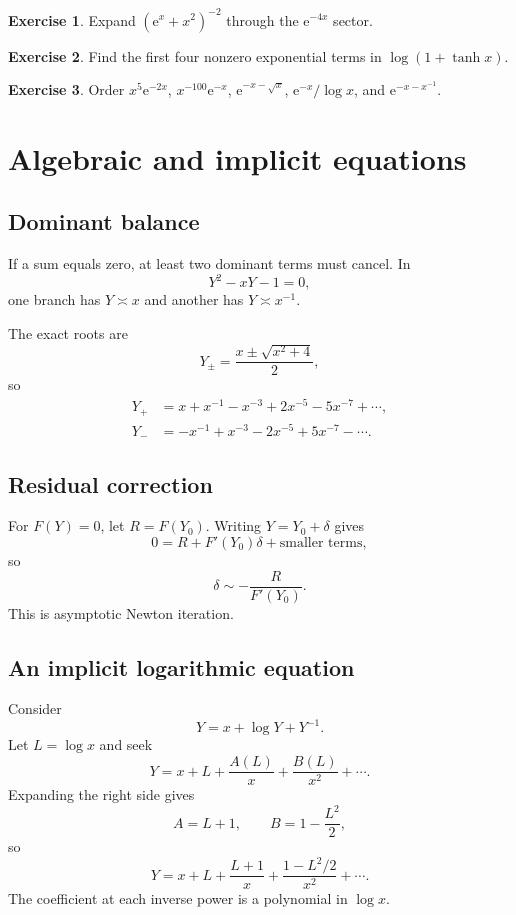\documentclass[11pt,oneside,openany]{book}
\newcommand{\e}{\mathrm{e}}
\theoremstyle{plain}
\theoremstyle{definition}
\newtheorem{exercise}{Exercise}[chapter]
\theoremstyle{remark}
\begin{document}
\begin{exercise}
Expand $(\e^x+x^2)^{-2}$ through the $\e^{-4x}$ sector.
\end{exercise}

\begin{exercise}
Find the first four nonzero exponential terms in $\log(1+\tanh x)$.
\end{exercise}

\begin{exercise}
Order $x^5\e^{-2x}$, $x^{-100}\e^{-x}$, $\e^{-x-\sqrt{x}}$, $\e^{-x}/\log x$, and $\e^{-x-x^{-1}}$.
\end{exercise}


\chapter{Algebraic and implicit equations}
\label{ch:implicit-equations}

\section{Dominant balance}
If a sum equals zero, at least two dominant terms must cancel. In
\[
  Y^2-xY-1=0,
\]
one branch has $Y\asymp x$ and another has $Y\asymp x^{-1}$.

The exact roots are
\[
  Y_\pm=\frac{x\pm\sqrt{x^2+4}}2,
\]
so
\[
\begin{aligned}
Y_+&=x+x^{-1}-x^{-3}+2x^{-5}-5x^{-7}+\cdots,\\
Y_-&=-x^{-1}+x^{-3}-2x^{-5}+5x^{-7}-\cdots.
\end{aligned}
\]

\section{Residual correction}
For $F(Y)=0$, let $R=F(Y_0)$. Writing $Y=Y_0+\delta$ gives
\[
  0=R+F'(Y_0)\delta+\text{smaller terms},
\]
so
\[
  \delta\sim-\frac{R}{F'(Y_0)}.
\]
This is asymptotic Newton iteration.

\section{An implicit logarithmic equation}
Consider
\[
  Y=x+\log Y+Y^{-1}.
\]
Let $L=\log x$ and seek
\[
  Y=x+L+\frac{A(L)}x+\frac{B(L)}{x^2}+\cdots.
\]
Expanding the right side gives
\[
  A=L+1,
  \qquad B=1-\frac{L^2}{2},
\]
so
\[
  Y=x+L+\frac{L+1}{x}+\frac{1-L^2/2}{x^2}+\cdots.
\]
The coefficient at each inverse power is a polynomial in $\log x$.
\end{document}
